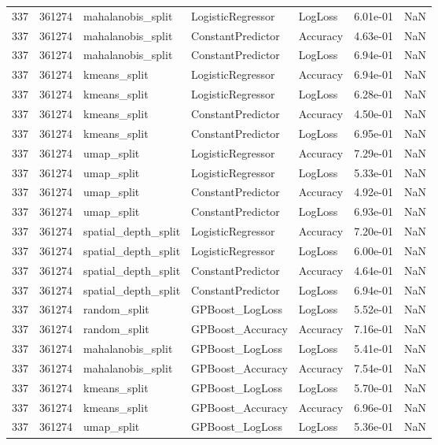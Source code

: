 \begin{tabular}{rrlllrr}
337 & 361274 & mahalanobis\_split & LogisticRegressor & LogLoss & 6.01e-01 & NaN \\
337 & 361274 & mahalanobis\_split & ConstantPredictor & Accuracy & 4.63e-01 & NaN \\
337 & 361274 & mahalanobis\_split & ConstantPredictor & LogLoss & 6.94e-01 & NaN \\
337 & 361274 & kmeans\_split & LogisticRegressor & Accuracy & 6.94e-01 & NaN \\
337 & 361274 & kmeans\_split & LogisticRegressor & LogLoss & 6.28e-01 & NaN \\
337 & 361274 & kmeans\_split & ConstantPredictor & Accuracy & 4.50e-01 & NaN \\
337 & 361274 & kmeans\_split & ConstantPredictor & LogLoss & 6.95e-01 & NaN \\
337 & 361274 & umap\_split & LogisticRegressor & Accuracy & 7.29e-01 & NaN \\
337 & 361274 & umap\_split & LogisticRegressor & LogLoss & 5.33e-01 & NaN \\
337 & 361274 & umap\_split & ConstantPredictor & Accuracy & 4.92e-01 & NaN \\
337 & 361274 & umap\_split & ConstantPredictor & LogLoss & 6.93e-01 & NaN \\
337 & 361274 & spatial\_depth\_split & LogisticRegressor & Accuracy & 7.20e-01 & NaN \\
337 & 361274 & spatial\_depth\_split & LogisticRegressor & LogLoss & 6.00e-01 & NaN \\
337 & 361274 & spatial\_depth\_split & ConstantPredictor & Accuracy & 4.64e-01 & NaN \\
337 & 361274 & spatial\_depth\_split & ConstantPredictor & LogLoss & 6.94e-01 & NaN \\
337 & 361274 & random\_split & GPBoost\_LogLoss & LogLoss & 5.52e-01 & NaN \\
337 & 361274 & random\_split & GPBoost\_Accuracy & Accuracy & 7.16e-01 & NaN \\
337 & 361274 & mahalanobis\_split & GPBoost\_LogLoss & LogLoss & 5.41e-01 & NaN \\
337 & 361274 & mahalanobis\_split & GPBoost\_Accuracy & Accuracy & 7.54e-01 & NaN \\
337 & 361274 & kmeans\_split & GPBoost\_LogLoss & LogLoss & 5.70e-01 & NaN \\
337 & 361274 & kmeans\_split & GPBoost\_Accuracy & Accuracy & 6.96e-01 & NaN \\
337 & 361274 & umap\_split & GPBoost\_LogLoss & LogLoss & 5.36e-01 & NaN \\

\end{tabular}
